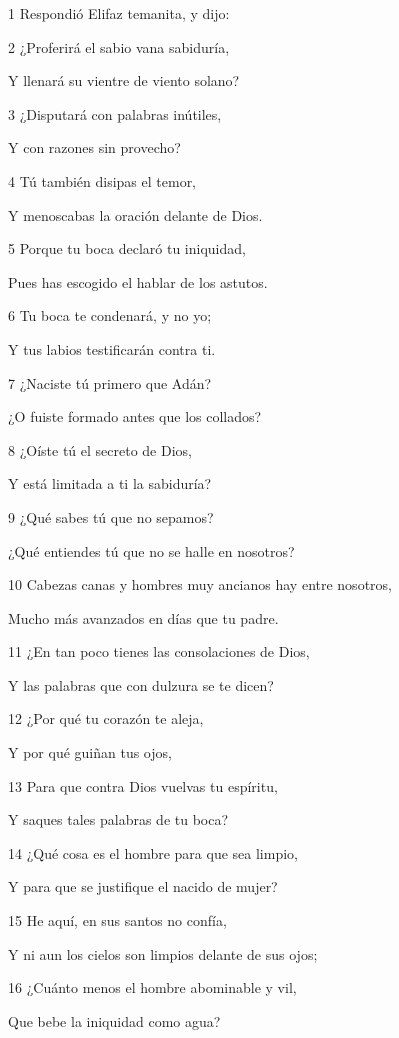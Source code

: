 \par 1 Respondió Elifaz temanita, y dijo:
\par 2 ¿Proferirá el sabio vana sabiduría,
\par Y llenará su vientre de viento solano?
\par 3 ¿Disputará con palabras inútiles,
\par Y con razones sin provecho?
\par 4 Tú también disipas el temor,
\par Y menoscabas la oración delante de Dios.
\par 5 Porque tu boca declaró tu iniquidad,
\par Pues has escogido el hablar de los astutos.
\par 6 Tu boca te condenará, y no yo;
\par Y tus labios testificarán contra ti.
\par 7 ¿Naciste tú primero que Adán?
\par ¿O fuiste formado antes que los collados?
\par 8 ¿Oíste tú el secreto de Dios,
\par Y está limitada a ti la sabiduría?
\par 9 ¿Qué sabes tú que no sepamos?
\par ¿Qué entiendes tú que no se halle en nosotros? 
\par 10 Cabezas canas y hombres muy ancianos hay entre nosotros,
\par Mucho más avanzados en días que tu padre.
\par 11 ¿En tan poco tienes las consolaciones de Dios,
\par Y las palabras que con dulzura se te dicen?
\par 12 ¿Por qué tu corazón te aleja,
\par Y por qué guiñan tus ojos,
\par 13 Para que contra Dios vuelvas tu espíritu,
\par Y saques tales palabras de tu boca?
\par 14 ¿Qué cosa es el hombre para que sea limpio,
\par Y para que se justifique el nacido de mujer?
\par 15 He aquí, en sus santos no confía,
\par Y ni aun los cielos son limpios delante de sus ojos;
\par 16 ¿Cuánto menos el hombre abominable y vil,
\par Que bebe la iniquidad como agua?
